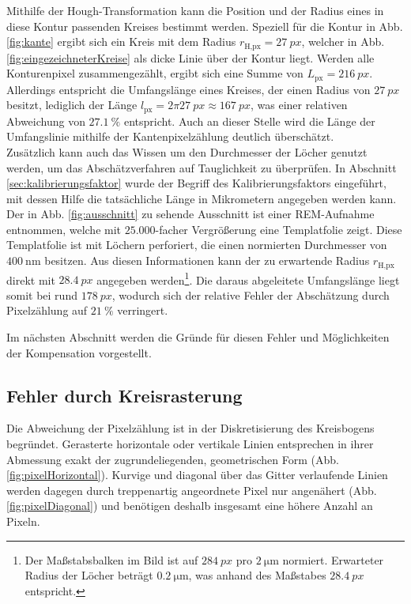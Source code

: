 \documentclass[accentcolor=tud1c, 11pt, toc=bib, toc=listof, captions=abovetable, parskip=half]{tudreport}
\begin{document}
Mithilfe der Hough-Transformation kann die Position und der Radius eines in diese Kontur passenden Kreises bestimmt werden. Speziell für die Kontur in Abb. \ref{fig:kante} ergibt sich ein Kreis mit dem Radius $r_{\text{H,px}} = \SI{27}{px}$, welcher in Abb. \ref{fig:eingezeichneterKreise} als dicke Linie über der Kontur liegt.
Werden alle Konturenpixel zusammengezählt, ergibt sich eine Summe von $L_{\text{px}}= \SI{216}{px}$. Allerdings entspricht die Umfangslänge eines Kreises, der einen Radius von $\SI{27}{px}$ besitzt, lediglich der Länge $l_{\text{px}} = 2\pi\SI{27}{px} \approx \SI{167}{px}$, was einer relativen Abweichung von $\SI{27.1}{\percent}$ entspricht. Auch an dieser Stelle wird die Länge der Umfangslinie mithilfe der Kantenpixelzählung deutlich überschätzt.\\
Zusätzlich kann auch das Wissen um den Durchmesser der Löcher genutzt werden, um das Abschätzverfahren auf Tauglichkeit zu überprüfen. In Abschnitt \ref{sec:kalibrierungsfaktor} wurde der Begriff des Kalibrierungsfaktors eingeführt, mit dessen Hilfe die tatsächliche Länge in Mikrometern angegeben werden kann. Der in Abb. \ref{fig:ausschnitt} zu sehende Ausschnitt ist einer REM-Aufnahme entnommen, welche mit $25.000$-facher Vergrößerung eine Templatfolie zeigt. Diese Templatfolie ist mit Löchern perforiert, die einen normierten Durchmesser von $\SI{400}{\nm}$ besitzen. Aus diesen Informationen kann der zu erwartende Radius $r_{\text{H,px}}$ direkt mit $\SI{28.4}{px}$ angegeben werden\footnote{Der Maßstabsbalken im Bild ist auf $\SI{284}{px}$ pro $\SI{2}{\micro\metre}$ normiert. Erwarteter Radius der Löcher beträgt $\SI{0.2}{\micro\metre}$, was anhand des Maßstabes $\SI{28.4}{px}$ entspricht.}. Die daraus abgeleitete Umfangslänge liegt somit bei rund $\SI{178}{px}$, wodurch sich der relative Fehler der Abschätzung durch Pixelzählung auf $\SI{21}{\percent}$ verringert.

Im nächsten Abschnitt werden die Gründe für diesen Fehler und Möglichkeiten der Kompensation vorgestellt.\\

\subsection{Fehler durch Kreisrasterung}
Die Abweichung der Pixelzählung ist in der Diskretisierung des Kreisbogens begründet. Gerasterte horizontale oder vertikale Linien entsprechen in ihrer Abmessung exakt der zugrundeliegenden, geometrischen Form (Abb. \ref{fig:pixelHorizontal}). Kurvige und diagonal über das Gitter verlaufende Linien werden dagegen durch treppenartig angeordnete Pixel nur angenähert (Abb. \ref{fig:pixelDiagonal}) und benötigen deshalb insgesamt eine höhere Anzahl an Pixeln.\\
\end{document}
